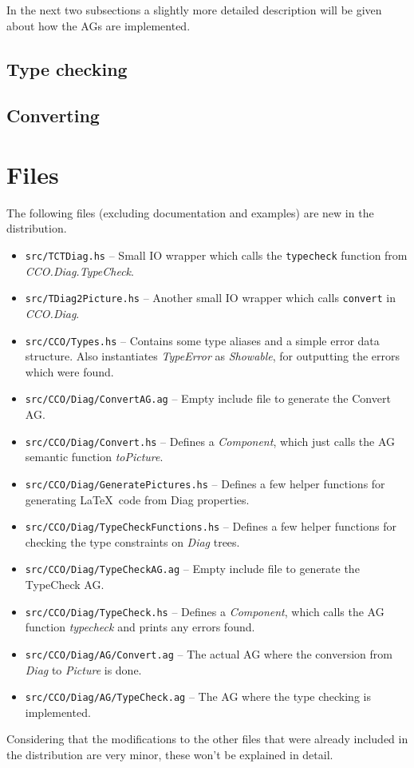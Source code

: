 \documentclass[a4paper]{article}
\begin{document}
In the next two subsections a slightly more detailed description will be given about how the AGs are implemented. 

\subsection{Type checking}



\subsection{Converting}



\section{Files}

The following files (excluding documentation and examples) are new in the distribution. 

\begin{itemize}
    \item \texttt{src/TCTDiag.hs} -- Small IO wrapper which calls the \texttt{typecheck} function from \emph{CCO.Diag.TypeCheck}. 
    \item \texttt{src/TDiag2Picture.hs} -- Another small IO wrapper which calls \texttt{convert} in \emph{CCO.Diag}.
    \item \texttt{src/CCO/Types.hs} -- Contains some type aliases and a simple error data structure. Also instantiates \emph{TypeError} as \emph{Showable}, for outputting the errors which were found. 
    \item \texttt{src/CCO/Diag/ConvertAG.ag} -- Empty include file to generate the Convert AG.
    \item \texttt{src/CCO/Diag/Convert.hs} -- Defines a \emph{Component}, which just calls the AG semantic function \emph{toPicture}. 
    \item \texttt{src/CCO/Diag/GeneratePictures.hs} -- Defines a few helper functions for generating \LaTeX\ code from Diag properties.
    \item \texttt{src/CCO/Diag/TypeCheckFunctions.hs} -- Defines a few helper functions for checking the type constraints on \emph{Diag} trees. 
    \item \texttt{src/CCO/Diag/TypeCheckAG.ag} -- Empty include file to generate the TypeCheck AG.
    \item \texttt{src/CCO/Diag/TypeCheck.hs} -- Defines a \emph{Component}, which calls the AG function \emph{typecheck} and prints any errors found.
    \item \texttt{src/CCO/Diag/AG/Convert.ag} -- The actual AG where the conversion from \emph{Diag} to \emph{Picture} is done. 
    \item \texttt{src/CCO/Diag/AG/TypeCheck.ag} -- The AG where the type checking is implemented.
\end{itemize}

Considering that the modifications to the other files that were already included in the distribution are very minor, these won't be explained in detail. 
\end{document}
